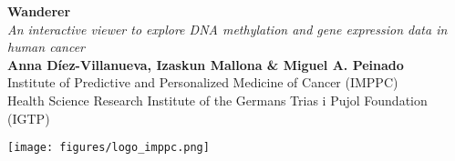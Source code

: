 \documentclass[a0,portrait]{a0poster}
\begin{document}
\fontsize{28}{30}\selectfont 



\begin{minipage}[t]{0.75\linewidth}
\veryHuge \color{boxcol} \textbf{Wanderer} \color{black}\\[-2cm] %

\Huge\textit{An interactive viewer to explore DNA methylation and gene expression data in human cancer}\\[-1cm] %

\LARGE \textbf{Anna D{\'i}ez-Villanueva, Izaskun Mallona \& Miguel A. Peinado}\\[0.5cm] %
\LARGE Institute of Predictive and Personalized Medicine of Cancer (IMPPC) \\[0.4cm] %
\LARGE Health Science Research Institute of the Germans Trias i Pujol Foundation (IGTP) \\[0.4cm] %

\end{minipage}
%
\begin{minipage}[t][4em][c]{0.25\linewidth}
\texttt{[image: figures/logo\_imppc.png]}\\
\end{minipage}

\vspace{1cm} %

\end{document}
